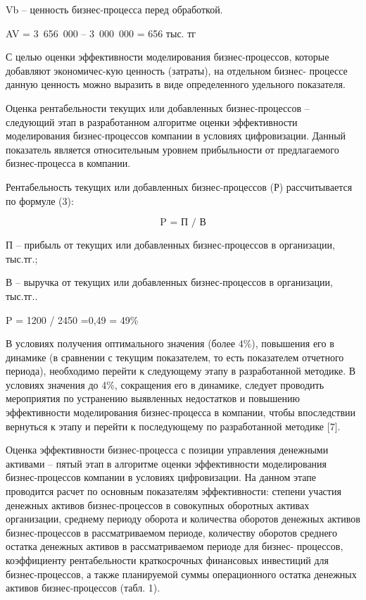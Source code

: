 \begin{multicols}{2}
Vb -- ценность бизнес-процесса перед обработкой.

\begin{center}
AV = 3~656~000 -- 3~000~000 = 656 тыс. тг
\end{center}


С целью оценки эффективности моделирования бизнес-процессов, которые
добавляют экономичес-кую ценность (затраты), на отдельном бизнес-
процессе данную ценность можно выразить в виде определенного удельного
показателя.

Оценка рентабельности текущих или добавленных бизнес-процессов --
следующий этап в разработанном алгоритме оценки эффективности
моделирования бизнес-процессов компании в условиях цифровизации. Данный
показатель является относительным уровнем прибыльности от предлагаемого
бизнес-процесса в компании.

Рентабельность текущих или добавленных бизнес-процессов (Р)
рассчитывается по формуле (3):

\begin{equation}
\text{P = П / В}
\end{equation}

П -- прибыль от текущих или добавленных бизнес-процессов в организации,
тыс.тг.;

В -- выручка от текущих или добавленных бизнес-процессов в организации,
тыс.тг..
\begin{center}
P = 1200 / 2450 =0,49 = 49\%
\end{center}


В условиях получения оптимального значения (более 4\%), повышения его в
динамике (в сравнении с текущим показателем, то есть показателем
отчетного периода), необходимо перейти к следующему этапу в
разработанной методике. В условиях значения до 4\%, сокращения его в
динамике, следует проводить мероприятия по устранению выявленных
недостатков и повышению эффективности моделирования бизнес-процесса в
компании, чтобы впоследствии вернуться к этапу и перейти к последующему
по разработанной методике {[}7{]}.

Оценка эффективности бизнес-процесса с позиции управления денежными
активами -- пятый этап в алгоритме оценки эффективности моделирования
бизнес-процессов компании в условиях цифровизации. На данном этапе
проводится расчет по основным показателям эффективности: степени участия
денежных активов бизнес-процессов в совокупных оборотных активах
организации, среднему периоду оборота и количества оборотов денежных
активов бизнес-процессов в рассматриваемом периоде, количеству оборотов
среднего остатка денежных активов в рассматриваемом периоде для бизнес-
процессов, коэффициенту рентабельности краткосрочных финансовых
инвестиций для бизнес-процессов, а также планируемой суммы операционного
остатка денежных активов бизнес-процессов (табл. 1).
\end{multicols}

